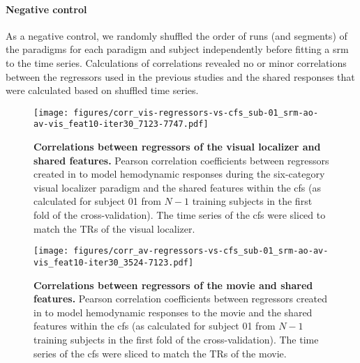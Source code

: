 \paragraph{Negative control}
As a negative control, we randomly shuffled the order of runs (and segments) of
the paradigms for each paradigm and subject independently before fitting a
\ac{srm} to the time series.
Calculations of correlations revealed no or minor correlations between the
regressors used in the previous studies and the shared responses that were
calculated based on shuffled time series.



\begin{figure*}[tbp]
\centering
\texttt{[image: figures/corr\_vis-regressors-vs-cfs\_sub-01\_srm-ao-av-vis\_feat10-iter30\_7123-7747.pdf]}
    \caption{
    \textbf{Correlations between regressors of the visual localizer and shared
    features.}
    Pearson correlation coefficients between regressors
    created in \citet{sengupta2016extension} to model hemodynamic responses
    during the six-category visual localizer paradigm
    and the shared features within the \ac{cfs}
    (as calculated for subject 01 from $N-1$ training subjects in the first
    fold of the cross-validation).
    The time series of the \ac{cfs} were sliced to match the TRs of the
    visual localizer.
    }
    \label{fig:corr-vis-reg-srm}
\end{figure*}


\begin{figure*}[tbp]
\centering
    \texttt{[image: figures/corr\_av-regressors-vs-cfs\_sub-01\_srm-ao-av-vis\_feat10-iter30\_3524-7123.pdf]}
    \caption{
    \textbf{Correlations between regressors of the movie and shared features.}
    Pearson correlation coefficients between regressors
    created in \citet{haeusler2022processing} to model hemodynamic responses to
    the movie
    \citep[cf. Table 3 in][]{haeusler2022processing}
    and the shared features within the \ac{cfs}
    (as calculated for subject 01 from $N-1$ training subjects in the first
    fold of the cross-validation).
    The time series of the \ac{cfs} were sliced to match the TRs of the
    movie.
    }
    \label{fig:corr-av-reg-srm}
\end{figure*}



